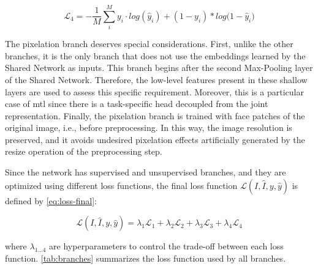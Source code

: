 \begin{equation}
\label{eq:loss-pixelation}
\mathcal{L}_4 = -\frac{1}{M} \sum_i^M {y_i \cdot log(\hat{y}_i) + (1-y_i)*log(1-\hat{y}_i})
\end{equation}
 
The pixelation branch deserves special considerations. First, unlike the other branches, it is the only branch that does not use the embeddings learned by the Shared Network as inputs. This branch begins after the second Max-Pooling layer of the Shared Network. Therefore, the low-level features present in these shallow layers are used to assess this specific requirement. Moreover, this is a particular case of \acl{mtl} since there is a task-specific head decoupled from the joint representation. Finally, the pixelation branch is trained with face patches of the original image, i.e., before preprocessing. In this way, the image resolution is preserved, and it avoids undesired pixelation effects artificially generated by the resize operation of the preprocessing step. 

Since the network has supervised and unsupervised branches, and they are optimized using different loss functions, the final loss function $\mathcal{L}(I, \hat{I}, y, \hat{y})$ is defined by \autoref{eq:loss-final}:
 
\begin{equation}
\label{eq:loss-final}
\mathcal{L}(I, \hat{I}, y, \hat{y}) = \lambda_1\mathcal{L}_1 + \lambda_2\mathcal{L}_2 + \lambda_3\mathcal{L}_3 + \lambda_4\mathcal{L}_4
\end{equation}
 
\noindent where $\lambda_{1...4}$ are hyperparameters to control the trade-off between each loss function. \autoref{tab:branches} summarizes the loss function used by all \methodname branches.



